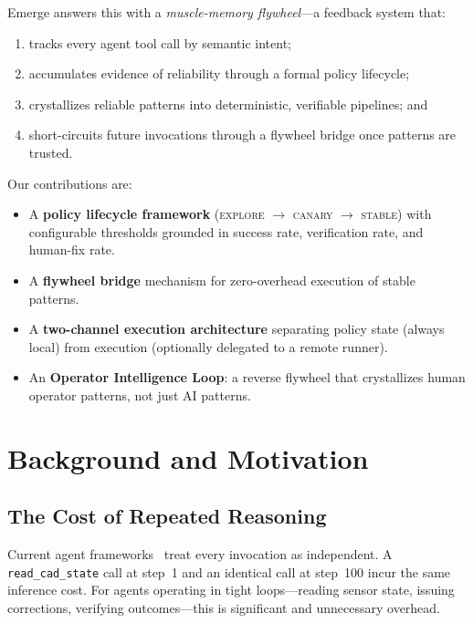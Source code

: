 \documentclass[11pt,a4paper]{article}
\begin{document}
Emerge answers this with a \emph{muscle-memory flywheel}---a feedback system that:
\begin{enumerate}
  \item tracks every agent tool call by semantic intent;
  \item accumulates evidence of reliability through a formal policy lifecycle;
  \item crystallizes reliable patterns into deterministic, verifiable pipelines; and
  \item short-circuits future invocations through a flywheel bridge once patterns are trusted.
\end{enumerate}

Our contributions are:
\begin{itemize}
  \item A \textbf{policy lifecycle framework} (\textsc{explore} $\to$ \textsc{canary} $\to$ \textsc{stable})
        with configurable thresholds grounded in success rate, verification rate, and human-fix rate.
  \item A \textbf{flywheel bridge} mechanism for zero-overhead execution of stable patterns.
  \item A \textbf{two-channel execution architecture} separating policy state (always local)
        from execution (optionally delegated to a remote runner).
  \item An \textbf{Operator Intelligence Loop}: a reverse flywheel that crystallizes human operator
        patterns, not just AI patterns.
\end{itemize}

\section{Background and Motivation}

\subsection{The Cost of Repeated Reasoning}

Current agent frameworks~\cite{yao2022react,significant2023autogpt,langchain2022} treat every invocation
as independent.
A \texttt{read\_cad\_state} call at step~1 and an identical call at step~100 incur the same inference cost.
For agents operating in tight loops---reading sensor state, issuing corrections, verifying outcomes---this is
significant and unnecessary overhead.
\end{document}
